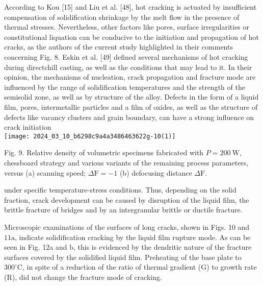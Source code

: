 \documentclass[10pt]{article}
\begin{document}
According to Kou [15] and Liu et al. [48], hot cracking is actuated by insufficient compensation of solidification shrinkage by the melt flow in the presence of thermal stresses. Nevertheless, other factors like pores, surface irregularities or constitutional liquation can be conducive to the initiation and propagation of hot cracks, as the authors of the current study highlighted in their comments concerning Fig. 8. Eskin et al. [49] defined several mechanisms of hot cracking during directchill casting, as well as the conditions that may lead to it. In their opinion, the mechanisms of nucleation, crack propagation and fracture mode are influenced by the range of solidification temperatures and the strength of the semisolid zone, as well as by structure of the alloy. Defects in the form of a liquid film, pores, intermetallic particles and a film of oxides, as well as the structure of defects like vacancy clusters and grain boundary, can have a strong influence on crack initiation\\
\texttt{[image: 2024\_03\_10\_b6298c9a4a3486463622g-10(1)]}

Fig. 9. Relative density of volumetric specimens fabricated with $P=200 \mathrm{~W}$, chessboard strategy and various variants of the remaining process parameters, versus (a) scanning speed; $\Delta \mathrm{F}=-1$ (b) defocusing distance $\Delta \mathrm{F}$.

under specific temperature-stress conditions. Thus, depending on the solid fraction, crack development can be caused by disruption of the liquid film, the brittle fracture of bridges and by an intergranular brittle or ductile fracture.

Microscopic examinations of the surfaces of long cracks, shown in Figs. 10 and $11 \mathrm{a}$, indicate solidification cracking by the liquid film rupture mode. As can be seen in Fig. 12a and b, this is evidenced by the dendritic nature of the fracture surfaces covered by the solidified liquid film. Preheating of the base plate to $300^{\circ} \mathrm{C}$, in spite of a reduction of the ratio of thermal gradient (G) to growth rate (R), did not change the fracture mode of cracking.
\end{document}
